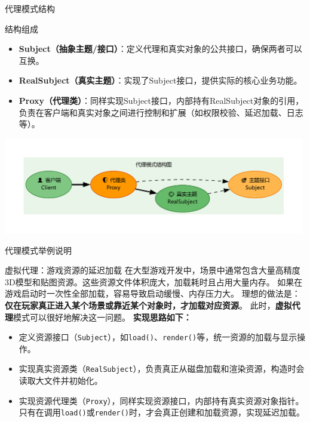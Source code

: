 \documentclass[UTF8,aspectratio=169]{beamer}
\begin{document}
\begin{frame}{代理模式结构}
    \begin{ytublock}{结构组成}
        \begin{itemize}
            \item \textbf{Subject（抽象主题/接口）}：定义代理和真实对象的公共接口，确保两者可以互换。
            \item \textbf{RealSubject（真实主题）}：实现了Subject接口，提供实际的核心业务功能。
            \item \textbf{Proxy（代理类）}：同样实现Subject接口，内部持有RealSubject对象的引用，负责在客户端和真实对象之间进行控制和扩展（如权限校验、延迟加载、日志等）。
        \end{itemize}
    \end{ytublock}
    \begin{center}
        \includegraphics[width=0.99\textwidth]{images/proxy_pattern.pdf}
    \end{center}
\end{frame}

\begin{frame}{代理模式举例说明}
    \begin{exampleytublock}{虚拟代理：游戏资源的延迟加载}
        在大型游戏开发中，场景中通常包含大量高精度3D模型和贴图资源。这些资源文件体积庞大，加载耗时且占用大量内存。
        如果在游戏启动时一次性全部加载，容易导致启动缓慢、内存压力大。
        理想的做法是：\textbf{仅在玩家真正进入某个场景或靠近某个对象时，才加载对应资源}。
        此时，\textbf{虚拟代理}模式可以很好地解决这一问题。
        \textbf{实现思路如下：}
        \begin{itemize}
            \item 定义资源接口（\texttt{Subject}），如\texttt{load()}、\texttt{render()}等，统一资源的加载与显示操作。
            \item 实现真实资源类（\texttt{RealSubject}），负责真正从磁盘加载和渲染资源，构造时会读取大文件并初始化。
            \item 实现资源代理类（\texttt{Proxy}），同样实现资源接口，内部持有真实资源对象指针。只有在调用\texttt{load()}或\texttt{render()}时，才会真正创建和加载资源，实现延迟加载。
        \end{itemize}
    \end{exampleytublock}
\end{frame}
\end{document}

